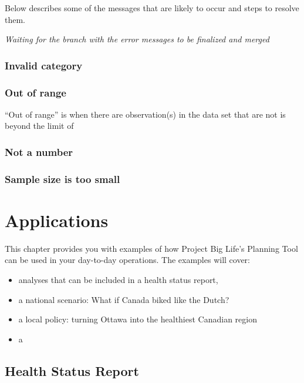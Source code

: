 \documentclass[]{book}
\providecommand{\tightlist}{%
  \setlength{\itemsep}{0pt}\setlength{\parskip}{0pt}}
\begin{document}
Below describes some of the messages that are likely to occur and steps
to resolve them.

\emph{Waiting for the branch with the error messages to be finalized and
merged}

\subsection{Invalid category}\label{invalid-category}

\subsection{Out of range}\label{out-of-range}

``Out of range'' is when there are observation(s) in the data set that
are not is beyond the limit of

\subsection{Not a number}\label{not-a-number}

\subsection{Sample size is too small}\label{sample-size-is-too-small}

\chapter{Applications}\label{applications}

This chapter provides you with examples of how Project Big Life's
Planning Tool can be used in your day-to-day operations. The examples
will cover:

\begin{itemize}
\tightlist
\item
  analyses that can be included in a health status report,
\item
  a national scenario: What if Canada biked like the Dutch?
\item
  a local policy: turning Ottawa into the healthiest Canadian region
\item
  a
\end{itemize}

\section{Health Status Report}\label{health-status-report}
\end{document}

